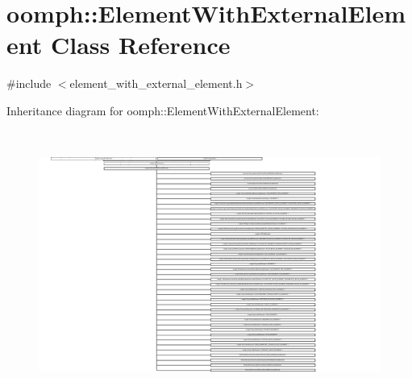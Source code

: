 \hypertarget{classoomph_1_1ElementWithExternalElement}{}\section{oomph\+:\+:Element\+With\+External\+Element Class Reference}
\label{classoomph_1_1ElementWithExternalElement}


{\ttfamily \#include $<$element\+\_\+with\+\_\+external\+\_\+element.\+h$>$}

Inheritance diagram for oomph\+:\+:Element\+With\+External\+Element\+:\begin{figure}[H]
\begin{center}
\leavevmode
\includegraphics[height=8.810831cm]{classoomph_1_1ElementWithExternalElement}
\end{center}
\end{figure}
